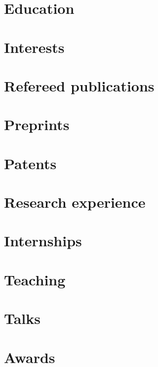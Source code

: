 \documentclass[10pt]{article}
\begin{document}



\section{Education}\label{sec:education}



\section{Interests}\label{sec:interests}



\section{Refereed publications}\label{sec:refereed-publications}



\section{Preprints}\label{sec:preprints}



\section{Patents}\label{sec:patents}



\section{Research experience}\label{sec:research-experience}



\section{Internships}\label{sec:internships}



\section{Teaching}\label{sec:teaching}



\section{Talks}\label{sec:talks}



\section{Awards}\label{sec:fellowships-and-awards}

\end{document}
